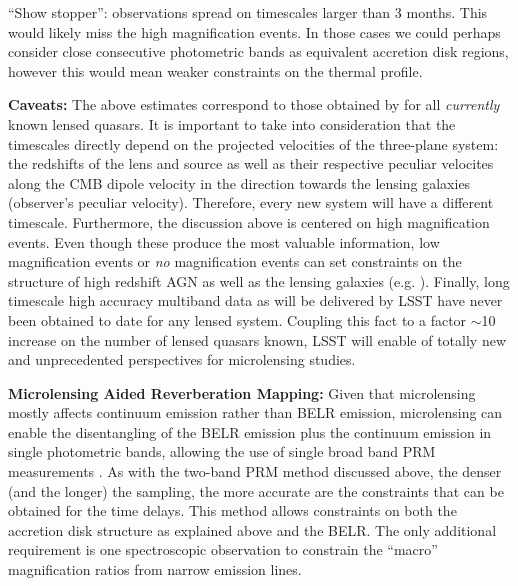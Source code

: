 ``Show stopper'': observations spread on timescales larger than 3 months.
This would likely miss the high magnification events. In those cases
we could perhaps consider close consecutive photometric bands as
equivalent accretion disk regions, however this would mean weaker
constraints on the thermal profile.

{\bf Caveats:} The above estimates correspond to those obtained by 
\citet{MosqueraandKochanek2011} for all \emph{currently} known lensed quasars. 
It is important to take into consideration that the timescales directly depend 
on the projected velocities of the three-plane system: the redshifts of the lens 
and source as well as their respective peculiar velocites along the CMB dipole 
velocity in the direction towards the lensing galaxies (observer's peculiar 
velocity). Therefore, every new system will have a different timescale. 
Furthermore, the discussion above is centered on high magnification events. Even 
though these produce the most valuable information, low magnification events or 
\emph{no} magnification events can set constraints on the structure of high 
redshift AGN as well as the lensing galaxies (e.g. \citealt{gilmerino2005}). 
Finally, long timescale high accuracy multiband data as will be delivered by 
LSST have never been obtained to date for any lensed system. Coupling this fact 
to a factor $\sim$10 increase on the number of lensed quasars known, LSST will 
enable of totally new and unprecedented perspectives for microlensing studies.
%

{\bf Microlensing Aided Reverberation Mapping:} Given that microlensing mostly 
affects continuum emission rather than BELR emission, microlensing can enable 
the disentangling of the BELR emission plus the continuum emission in single 
photometric bands, allowing the use of single broad band PRM measurements 
\citep{SluseandTewes2014}. As with the two-band PRM method discussed above, the 
denser (and the longer) the sampling, the more accurate are the constraints that 
can be obtained for the time delays. This method allows constraints on both the 
accretion disk structure as explained above and the BELR. The only additional 
requirement is one spectroscopic observation to constrain the ``macro'' 
magnification ratios from narrow emission lines.

